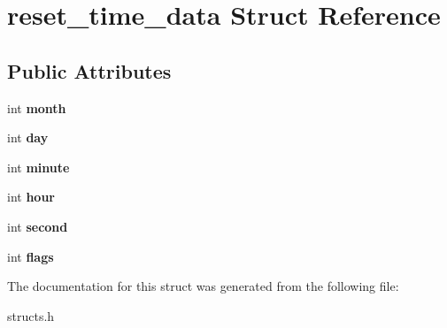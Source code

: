 \hypertarget{structreset__time__data}{\section{reset\-\_\-time\-\_\-data Struct Reference}
\label{structreset__time__data}
}
\subsection*{Public Attributes}
\begin{DoxyCompactItemize}
\item 
\hypertarget{structreset__time__data_ab320b6195efd25d466a2e9bc295f305e}{int {\bfseries month}}\label{structreset__time__data_ab320b6195efd25d466a2e9bc295f305e}

\item 
\hypertarget{structreset__time__data_a6efbbdbd811a8d6c678a51beac313a94}{int {\bfseries day}}\label{structreset__time__data_a6efbbdbd811a8d6c678a51beac313a94}

\item 
\hypertarget{structreset__time__data_afa7cb8034b959b3b234125a81a7eaee7}{int {\bfseries minute}}\label{structreset__time__data_afa7cb8034b959b3b234125a81a7eaee7}

\item 
\hypertarget{structreset__time__data_a62ede3dfbfbdc66afcb90471974a9bc5}{int {\bfseries hour}}\label{structreset__time__data_a62ede3dfbfbdc66afcb90471974a9bc5}

\item 
\hypertarget{structreset__time__data_aae7671c11352b020ff22a146fc209c3b}{int {\bfseries second}}\label{structreset__time__data_aae7671c11352b020ff22a146fc209c3b}

\item 
\hypertarget{structreset__time__data_abdeb58a107e8bb7674f5d879027f71b9}{int {\bfseries flags}}\label{structreset__time__data_abdeb58a107e8bb7674f5d879027f71b9}

\end{DoxyCompactItemize}


The documentation for this struct was generated from the following file\-:\begin{DoxyCompactItemize}
\item 
structs.\-h\end{DoxyCompactItemize}
